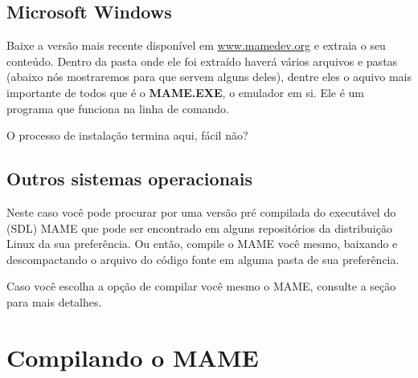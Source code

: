 \documentclass[letterpaper,10pt,brazil]{sphinxmanual}
\begin{document}
\subsection{Microsoft Windows}
\label{initialsetup/installingmame:microsoft-windows}
Baixe a versão mais recente disponível em
\href{https://www.mamedev.org/}{www.mamedev.org} e extraia o seu conteúdo.
Dentro da pasta onde ele foi extraído haverá vários arquivos e pastas
(abaixo nós mostraremos para que servem alguns deles), dentre eles o
aquivo mais importante de todos que é o \textbf{MAME.EXE}, o emulador em si.
Ele é um programa que funciona na linha de comando.

O processo de instalação termina aqui, fácil não?


\subsection{Outros sistemas operacionais}
\label{initialsetup/installingmame:outros-sistemas-operacionais}
Neste caso você pode procurar por uma versão pré compilada do executável
do (SDL) MAME que pode ser encontrado em alguns repositórios da
distribuição Linux da sua preferência. Ou então, compile o MAME você
mesmo, baixando e descompactando o arquivo do código fonte em alguma
pasta de sua preferência.

Caso você escolha a opção de compilar você mesmo o MAME, consulte a
seção {\hyperref[initialsetup/compilingmame:compiling\string-mame]{}} para mais detalhes.


\section{Compilando o MAME}
\label{initialsetup/compilingmame:compilando-o-mame}\label{initialsetup/compilingmame::doc}\label{initialsetup/compilingmame:compiling-mame}
\end{document}
